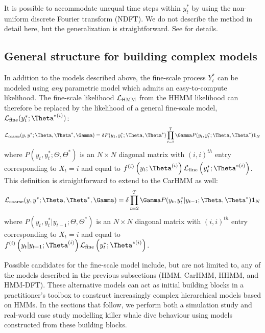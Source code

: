 It is possible to accommodate unequal time steps within $y_t^*$ by using the non-uniform discrete Fourier transform (NDFT). We do not describe the method in detail here, but the generalization is straightforward. See \citet{Bagchi:1999} for details.

\subsection{General structure for building complex models}

In addition to the models described above, the fine-scale process $Y^*_t$ can be modeled using \textit{any} parametric model which admits an easy-to-compute likelihood. The fine-scale likelihood $\mathcal{L}_{\text{HMM}}$ from the HHMM likelihood can therefore be replaced by the likelihood of a general fine-scale model, $\calL_{\text{fine}}(y^*_t;\Theta^{*(i)})$:
\[
\calL_{\text{coarse}}(y,y^*;\Theta,\Theta^*,\Gamma) = \delta P(y_1,y^*_1;\Theta,\Theta^*) \prod_{t=2}^T \Gamma P(y_t,y^*_t;\Theta,\Theta^*) \mathbf{1}_N
\]
where $P(y_t,y^*_t;\Theta,\Theta^*) $ is an $N \times N$ diagonal matrix with $(i,i)^{th}$ entry corresponding to $X_t=i$ and equal to $f^{(i)}\left(y_t;\Theta^{(i)}\right)\calL_{\text{fine}}\left(y^*_t;\Theta^{*(i)}\right)$. This definition is straightforward to extend to the CarHMM as well:
\[
\calL_{\text{coarse}}(y,y^*;\Theta,\Theta^*,\Gamma) = \delta \prod_{t=2}^T \Gamma P(y_t,y^*_t|y_{t-1};\Theta,\Theta^*) \mathbf{1}_N
\]
where $P(y_t,y^*_t|y_{t-1};\Theta,\Theta^*) $ is an $N \times N$ diagonal matrix with $(i,i)^{th}$ entry corresponding to $X_t=i$ and equal to $f^{(i)}\left(y_t|y_{t-1};\Theta^{(i)}\right)\calL_{\text{fine}}\left(y^*_t;\Theta^{*(i)}\right)$.

Possible candidates for the fine-scale model include, but are not limited to, any of the models described in the previous subsections (HMM, CarHMM, HHMM, and HMM-DFT). These alternative models can act as initial building blocks in a practitioner's toolbox to construct increasingly complex hierarchical models based on HMMs. In the sections that follow, we perform both a simulation study and real-world case study modelling killer whale dive behaviour using models constructed from these building blocks.